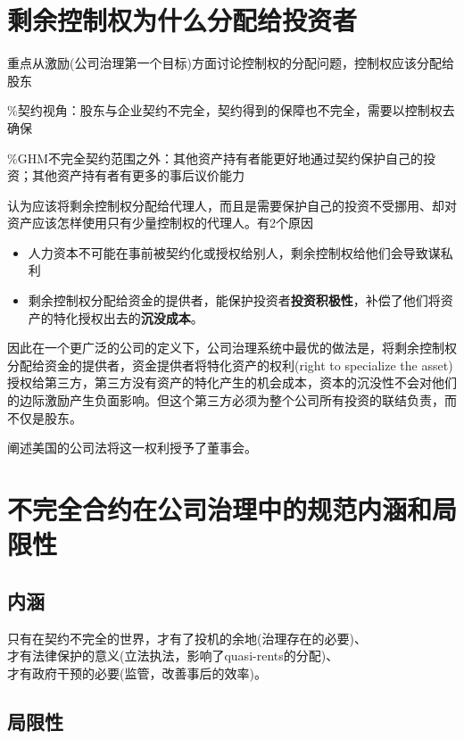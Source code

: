 \documentclass[a4paper]{article}
\begin{document}
\section{剩余控制权为什么分配给投资者}
重点从激励(公司治理第一个目标)方面讨论控制权的分配问题，控制权应该分配给股东\par
% 
\%契约视角：股东与企业契约不完全，契约得到的保障也不完全，需要以控制权去确保\par 
%
\%GHM不完全契约范围之外：其他资产持有者能更好地通过契约保护自己的投资；其他资产持有者有更多的事后议价能力\par 

\citet{rajan1998} 认为应该将剩余控制权分配给代理人，而且是需要保护自己的投资不受挪用、却对资产应该怎样使用只有少量控制权的代理人。有2个原因
\begin{itemize}
	\item 人力资本不可能在事前被契约化或授权给别人，剩余控制权给他们会导致谋私利
	\item 剩余控制权分配给资金的提供者，能保护投资者\textbf{投资积极性}，补偿了他们将资产的特化授权出去的\textbf{沉没成本}。
\end{itemize}

因此在一个更广泛的公司的定义下，公司治理系统中最优的做法是，将剩余控制权分配给资金的提供者，资金提供者将特化资产的权利(right to specialize the asset)授权给第三方，第三方没有资产的特化产生的机会成本，资本的沉没性不会对他们的边际激励产生负面影响。但这个第三方必须为整个公司所有投资的联结负责，而不仅是股东。\par

\citet{blair1999}阐述美国的公司法将这一权利授予了董事会。\par


\section{不完全合约在公司治理中的规范内涵和局限性}
\subsection{内涵}
只有在契约不完全的世界，才有了投机的余地(治理存在的必要)、\\
才有法律保护的意义(立法执法，影响了quasi-rents的分配)、\\
才有政府干预的必要(监管，改善事后的效率)。

\subsection{局限性}
{\color{red}{
a. 不完全契约对所有权分配的解释严重依赖于我们可以缔结什么合同\\
b. 严重依赖于代理人对所有未来意外事故的预测}
}
\end{document}
